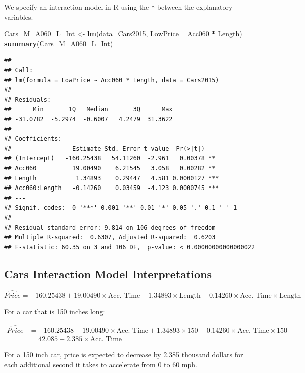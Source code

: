 \documentclass[]{book}
\newenvironment{Shaded}{\begin{snugshade}}{\end{snugshade}}
\newcommand{\KeywordTok}[1]{\textcolor[rgb]{0.13,0.29,0.53}{\textbf{#1}}}
\newcommand{\DataTypeTok}[1]{\textcolor[rgb]{0.13,0.29,0.53}{#1}}
\newcommand{\StringTok}[1]{\textcolor[rgb]{0.31,0.60,0.02}{#1}}
\newcommand{\OperatorTok}[1]{\textcolor[rgb]{0.81,0.36,0.00}{\textbf{#1}}}
\newcommand{\NormalTok}[1]{#1}
\begin{document}
We specify an interaction model in R using the \texttt{*} between the
explanatory variables.

\begin{Shaded}
\begin{Highlighting}[]
\NormalTok{Cars_M_A060_L_Int <-}\StringTok{ }\KeywordTok{lm}\NormalTok{(}\DataTypeTok{data=}\NormalTok{Cars2015, LowPrice }\OperatorTok{~}\StringTok{ }\NormalTok{Acc060 }\OperatorTok{*}\StringTok{ }\NormalTok{Length)}
\KeywordTok{summary}\NormalTok{(Cars_M_A060_L_Int)}
\end{Highlighting}
\end{Shaded}

\begin{verbatim}
## 
## Call:
## lm(formula = LowPrice ~ Acc060 * Length, data = Cars2015)
## 
## Residuals:
##      Min       1Q   Median       3Q      Max 
## -31.0782  -5.2974  -0.6007   4.2479  31.3622 
## 
## Coefficients:
##                 Estimate Std. Error t value  Pr(>|t|)    
## (Intercept)   -160.25438   54.11260  -2.961   0.00378 ** 
## Acc060          19.00490    6.21545   3.058   0.00282 ** 
## Length           1.34893    0.29447   4.581 0.0000127 ***
## Acc060:Length   -0.14260    0.03459  -4.123 0.0000745 ***
## ---
## Signif. codes:  0 '***' 0.001 '**' 0.01 '*' 0.05 '.' 0.1 ' ' 1
## 
## Residual standard error: 9.814 on 106 degrees of freedom
## Multiple R-squared:  0.6307, Adjusted R-squared:  0.6203 
## F-statistic: 60.35 on 3 and 106 DF,  p-value: < 0.00000000000000022
\end{verbatim}

\subsection{Cars Interaction Model
Interpretations}\label{cars-interaction-model-interpretations}

\(\widehat{Price} = -160.25438 + 19.00490\times\text{Acc. Time} + 1.34893\times\text{Length} - 0.14260\times\text{Acc. Time}\times\text{Length}\)

For a car that is 150 inches long:

\[
\begin{aligned}
\widehat{Price} & = -160.25438 + 19.00490\times\text{Acc. Time} + 1.34893\times150 - 0.14260\times\text{Acc. Time}\times150 \\
 &= 42.085 -2.385\times\text{Acc. Time} 
\end{aligned}
\]

For a 150 inch car, price is expected to decrease by 2.385 thousand
dollars for each additional second it takes to accelerate from 0 to 60
mph.
\end{document}
